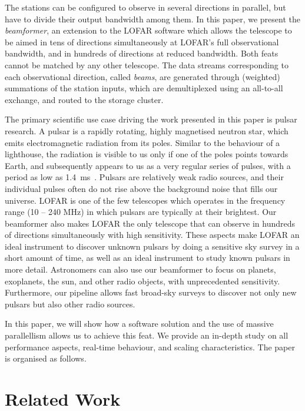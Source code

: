 \documentclass{llncs}
\begin{document}
The stations can be configured to observe in several directions in parallel, but have to divide their output bandwidth among them. In this paper, we present the \emph{beamformer}, an extension to the LOFAR software which allows the telescope to be aimed in tens of directions simultaneously at LOFAR's full observational bandwidth, and in hundreds of directions at reduced bandwidth. Both feats cannot be matched by any other telescope. The data streams corresponding to each observational direction, called \emph{beams}, are generated through (weighted) summations of the station inputs, which are demultiplexed using an all-to-all exchange, and routed to the storage cluster.

The primary scientific use case driving the work presented in this paper is pulsar research. A pulsar is a rapidly rotating, highly magnetised neutron star, which emits electromagnetic radiation from its poles. Similar to the behaviour of a lighthouse, the radiation is visible to us only if one of the poles points towards Earth, and subsequently appears to us as a very regular series of pulses, with a period as low as 1.4~ms~\cite{Hessels:06}. Pulsars are relatively weak radio sources, and their individual pulses often do not rise above the background noise that fills our universe. LOFAR is one of the few telescopes which operates in the frequency range (10 -- 240 MHz) in which pulsars are typically at their brightest. Our beamformer also makes LOFAR the only telescope that can observe in hundreds of directions simultaneously with high sensitivity. These aspects make LOFAR an ideal instrument to discover unknown pulsars by doing a sensitive sky survey in a short amount of time, as well as an ideal instrument to study known pulsars in more detail. Astronomers can also use our beamformer to focus on planets, exoplanets, the sun, and other radio objects, with unprecedented sensitivity. Furthermore, our pipeline allows fast broad-sky surveys to discover not only new pulsars but also other radio sources.


In this paper, we will show how a software solution and the use of massive parallellism allows us to achieve this feat. We provide an in-depth study on all performance aspects, real-time behaviour, and scaling characteristics. The paper is organised as follows.

\section{Related Work}
\end{document}
